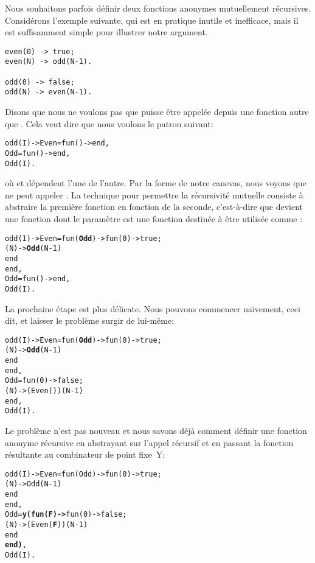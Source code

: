 Nous souhaitons parfois définir deux fonctions anonymes mutuellement
récursives. Considérons l'exemple suivante, qui est en pratique
inutile et inefficace, mais il est suffisamment simple pour illustrer
notre argument.
\begin{verbatim}
even(0) -> true;
even(N) -> odd(N-1).

odd(0) -> false;
odd(N) -> even(N-1).
\end{verbatim}
Disons que nous ne voulons pas que  puisse être
appelée depuis une fonction autre que . Cela veut dire
que nous voulons le patron suivant:
\begin{alltt}
odd(I) -> Even = fun() ->  end,
          Odd  = fun() ->  end,
          Odd(I).
\end{alltt}
où  et  dépendent l'une de l'autre. Par la
forme de notre canevas, nous voyons que  ne peut appeler
. La technique pour permettre la récursivité mutuelle
consiste à abstraire la première fonction en fonction de la seconde,
c'est-à-dire que  devient une fonction dont le paramètre
est une fonction destinée à être utilisée comme :
\begin{alltt}
odd(I) -> Even = fun(\textbf{Odd}) -> fun(0) -> true;
                                (N) -> \textbf{Odd}(N-1)
                             end
                 end,
          Odd  = fun() ->  end,
          Odd(I).
\end{alltt}
La prochaine étape est plus délicate. Nous pouvons commencer
na\"{\i}vement, ceci dit, et laisser le problème surgir de lui-même:
\begin{alltt}
odd(I) -> Even = fun(\textbf{Odd}) -> fun(0) -> true;
                                (N) -> \textbf{Odd}(N-1)
                             end
                 end,
          Odd  = fun(0) -> false;
                    (N) -> (Even())(N-1)
                 end,
          Odd(I).
\end{alltt}
Le problème n'est pas nouveau et nous savons déjà comment définir une
fonction anonyme récursive en abstrayant sur l'appel récursif et en
passant la fonction résultante au combinateur de point fixe~Y:
\begin{alltt}
odd(I) -> Even = fun(Odd) -> fun(0) -> true;
                                (N) -> Odd(N-1)
                             end
                 end,
          Odd  = \textbf{y(fun(F) ->} fun(0) -> false;
                                (N) -> (Even(\textbf{F}))(N-1)
                             end
                   \textbf{end)},
          Odd(I).
\end{alltt}
